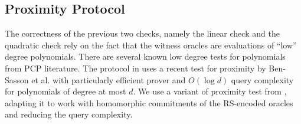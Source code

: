 \begin{comment}
\subsubsection{Proximity Test}
The correctness of the previous two checks, namely the linear check and the
quadratic check rely on the fact that the witness oracles are evaluations of
``low'' degree polynomials. There are several known low degree tests for polynomials
from PCP literature. The protocol in \cite{aurora} uses a recent test for
proximity by Ben-Sasson et al.\cite{IOPP_FRI2018} with particularly efficient
prover and $O(\log d)$ query complexity for polynomials of degree at most $d$. 
We use a variant of proximity test from \cite{ligero}, adapting it to work
with homomorphic commitments of the RS-encoded oracles and reducing the query
complexity.
\end{comment}
\subsection{Proximity Protocol}\label{subsec:proximity2D}
The correctness of the previous two checks, namely the linear check and the
quadratic check rely on the fact that the witness oracles are evaluations of
``low'' degree polynomials. There are several known low degree tests for polynomials
from PCP literature. The protocol in \cite{aurora} uses a recent test for
proximity by Ben-Sasson et al.\cite{IOPP_FRI2018} with particularly efficient
prover and $O(\log d)$ query complexity for polynomials of degree at most $d$. 
We use a variant of proximity test from \cite{ligero}, adapting it to work
with homomorphic commitments of the RS-encoded oracles and reducing the query
complexity.

